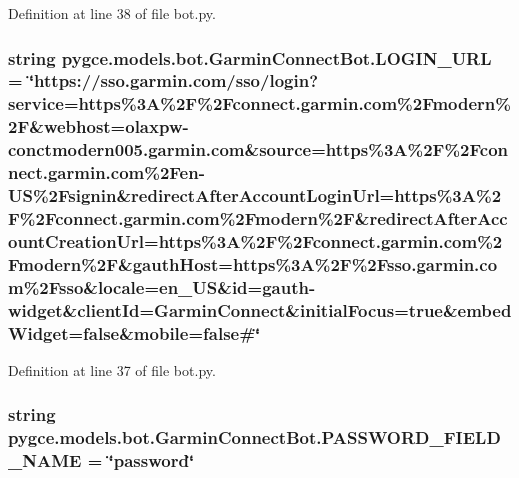 Definition at line 38 of file bot.\+py.

\subsubsection[{\texorpdfstring{L\+O\+G\+I\+N\+\_\+\+U\+RL}{LOGIN_URL}}]{\setlength{\rightskip}{0pt plus 5cm}string pygce.\+models.\+bot.\+Garmin\+Connect\+Bot.\+L\+O\+G\+I\+N\+\_\+\+U\+RL = \char`\"{}https\+://sso.\+garmin.\+com/sso/{\bf login}?service=https\%3\+A\%2\+F\%2\+Fconnect.\+garmin.\+com\%2\+Fmodern\%2\+F\&webhost=olaxpw-\/conctmodern005.\+garmin.\+com\&source=https\%3\+A\%2\+F\%2\+Fconnect.\+garmin.\+com\%2\+Fen-\/\+U\+S\%2\+Fsignin\&redirect\+After\+Account\+Login\+Url=https\%3\+A\%2\+F\%2\+Fconnect.\+garmin.\+com\%2\+Fmodern\%2\+F\&redirect\+After\+Account\+Creation\+Url=https\%3\+A\%2\+F\%2\+Fconnect.\+garmin.\+com\%2\+Fmodern\%2\+F\&gauth\+Host=https\%3\+A\%2\+F\%2\+Fsso.\+garmin.\+com\%2\+Fsso\&locale=en\+\_\+\+U\+S\&id=gauth-\/widget\&client\+Id=\+Garmin\+Connect\&initial\+Focus=true\&embed\+Widget=false\&mobile=false\#\char`\"{}\hspace{0.3cm}{\ttfamily [static]}}\hypertarget{classpygce_1_1models_1_1bot_1_1_garmin_connect_bot_a43f013f65c970ca2dc82e066d8de4d2b}{}\label{classpygce_1_1models_1_1bot_1_1_garmin_connect_bot_a43f013f65c970ca2dc82e066d8de4d2b}


Definition at line 37 of file bot.\+py.

\subsubsection[{\texorpdfstring{P\+A\+S\+S\+W\+O\+R\+D\+\_\+\+F\+I\+E\+L\+D\+\_\+\+N\+A\+ME}{PASSWORD_FIELD_NAME}}]{\setlength{\rightskip}{0pt plus 5cm}string pygce.\+models.\+bot.\+Garmin\+Connect\+Bot.\+P\+A\+S\+S\+W\+O\+R\+D\+\_\+\+F\+I\+E\+L\+D\+\_\+\+N\+A\+ME = \char`\"{}password\char`\"{}\hspace{0.3cm}{\ttfamily [static]}}\hypertarget{classpygce_1_1models_1_1bot_1_1_garmin_connect_bot_aa5839cf18d60997c81245cebea3eb307}{}\label{classpygce_1_1models_1_1bot_1_1_garmin_connect_bot_aa5839cf18d60997c81245cebea3eb307}


